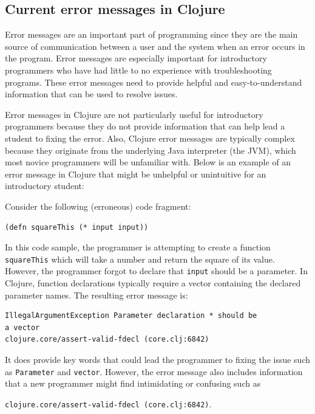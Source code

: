 \documentclass[12pt]{article}
\newcommand{\comment}[1]{{\bf \tt  {#1}}}
\newcommand{\emcomment}[1]{\textcolor{ForestGreen}{\comment{Elena: {#1}}}}
\begin{document}
\subsection{Current error messages in Clojure}\label{sec:currentem}
Error messages are an important part of programming since they are the main source of communication between a user and the system when an error occurs in the program.
Error messages are especially important for introductory programmers who have had little to no experience with troubleshooting programs. %
These error messages need to provide helpful and easy-to-understand information that can be used to resolve issues.

Error messages in Clojure are not particularly useful for introductory programmers because they do not provide information that can help lead a student to fixing the error.
Also, Clojure error messages are typically complex because they originate from the underlying Java interpreter (the JVM), which most %
novice programmers will be unfamiliar with.
Below is an example of an error message in Clojure that might be unhelpful or unintuitive for an introductory student:

Consider the following (erroneous) code fragment:
\begin{verbatim}
(defn squareThis (* input input))
\end{verbatim}

In this code sample, the programmer is attempting to create a function \texttt{squareThis} which will take a number and return the square of its value.
However, the programmer forgot to declare that \texttt{input} should be a parameter.
In Clojure, function declarations typically require a vector containing the declared parameter names.
The resulting error message is: 
\begin{verbatim}
IllegalArgumentException Parameter declaration * should be 
a vector 
clojure.core/assert-valid-fdecl (core.clj:6842)
\end{verbatim}
It does provide key words that could lead the programmer to fixing the issue such as \texttt{Parameter} and \texttt{vector}.
However, the error message also includes information that a new programmer might find intimidating or confusing such as 

\noindent
\texttt{clojure.core/assert-valid-fdecl (core.clj:6842)}.
\end{document}

